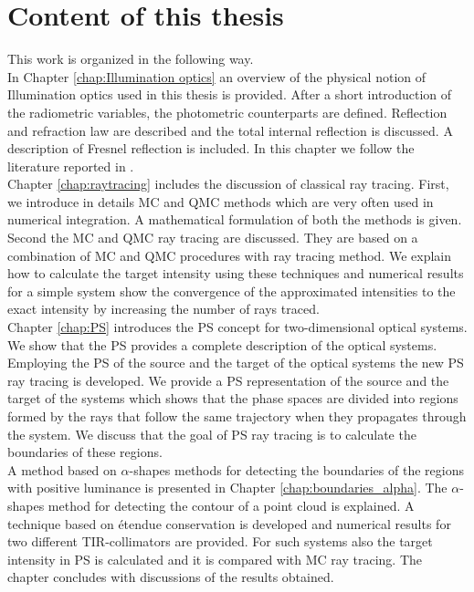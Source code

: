 \section{Content of this thesis}
This work is organized in the following way.\\ \indent
In Chapter \ref{chap:Illumination optics} an overview of the physical notion of Illumination optics used in this thesis is provided. After a short introduction of the radiometric variables, the photometric counterparts are defined. Reflection and refraction law are described and the total internal reflection is discussed. A description of Fresnel reflection is included. In this chapter we follow the literature reported in \cite{hecht1998hecht, feynman2011feynman, feynman1964feynman}.\\ \indent
Chapter \ref{chap:raytracing} includes the discussion of classical ray tracing. First, we introduce in details MC and QMC methods which are very often used in numerical integration. A mathematical formulation of both the methods is given. Second the MC and QMC ray tracing are discussed. They are based on a combination of MC and QMC procedures with ray tracing method. We explain how to calculate the target intensity using these techniques and numerical results for a simple system show the convergence of the approximated intensities to the exact intensity by increasing the number of rays traced.\\\indent
Chapter \ref{chap:PS} introduces the PS concept for two-dimensional optical systems. We show that the PS provides a complete description of the optical systems. Employing the PS of the source and the target of the optical systems the new PS ray tracing is developed. We provide a PS representation of the source and the target of the systems which shows that the phase spaces are divided into regions formed by the rays that follow the same trajectory when they propagates through the system. We discuss that the goal of PS ray tracing is to calculate the boundaries of these regions. \\ \indent 
A method based on $\alpha$-shapes methods for detecting the boundaries of the regions with positive luminance is presented in Chapter \ref{chap:boundaries_alpha}. The $\alpha$-shapes method for detecting the contour of a point cloud is explained. A technique based on \'{e}tendue conservation is developed and numerical results for two different TIR-collimators are provided. For such systems also the target intensity in PS is calculated and it is compared with MC ray tracing. The chapter concludes with discussions of the results obtained.\\ \indent
